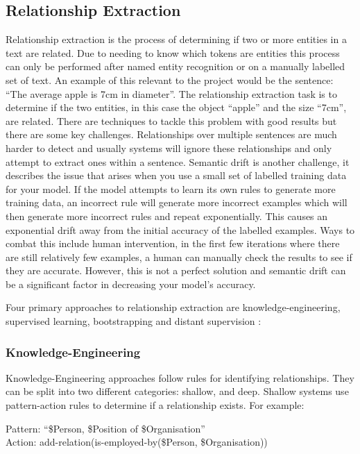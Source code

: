 \subsection{Relationship Extraction}

Relationship extraction is the process of determining if two or more entities in a text are related. Due to needing to know which tokens are entities this process can only be performed after named entity recognition or on a manually labelled set of text. An example of this relevant to the project would be the sentence: “The average apple is 7cm in diameter”. The relationship extraction task is to determine if the two entities, in this case the object “apple” and the size “7cm”, are related. There are techniques to tackle this problem with good results but there are some key challenges. Relationships over multiple sentences are much harder to detect and usually systems will ignore these relationships and only attempt to extract ones within a sentence. Semantic drift is another challenge, it describes the issue that arises when you use a small set of labelled training data for your model. If the model attempts to learn its own rules to generate more training data, an incorrect rule will generate more incorrect examples which will then generate more incorrect rules and repeat exponentially. This causes an exponential drift away from the initial accuracy of the labelled examples. Ways to combat this include human intervention, in the first few iterations where there are still relatively few examples, a human can manually check the results to see if they are accurate. However, this is not a perfect solution and semantic drift can be a significant factor in decreasing your model’s accuracy.

Four primary approaches to relationship extraction are knowledge-engineering, supervised learning, bootstrapping and distant supervision \citep{text_processing_lecture_6}:

\subsubsection{Knowledge-Engineering}

Knowledge-Engineering approaches follow rules for identifying relationships. They can be split into two different categories: shallow, and deep. Shallow systems use pattern-action rules to determine if a relationship exists. For example:

\begin{displayquote}
Pattern: “\$Person, \$Position of \$Organisation” 
\\Action:  add-relation(is-employed-by(\$Person, \$Organisation))
\end{displayquote}

